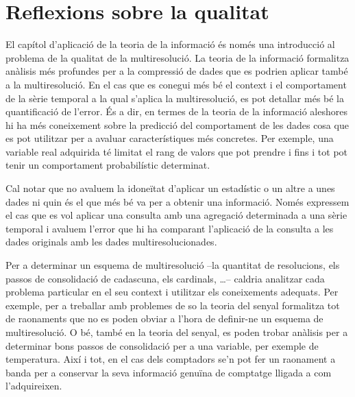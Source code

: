 \section{Reflexions sobre la qualitat}


El capítol d'aplicació de la teoria de la informació és només una
introducció al problema de la qualitat de la multiresolució.  La
teoria de la informació formalitza anàlisis més profundes per a la
compressió de dades que es podrien aplicar també a la multiresolució.
En el cas que es conegui més bé el context i el comportament de la
sèrie temporal a la qual s'aplica la multiresolució, es pot detallar
més bé la quantificació de l'error. És a dir, en termes de la teoria
de la informació aleshores hi ha més coneixement sobre la predicció
del comportament de les dades cosa que es pot utilitzar per a avaluar
característiques més concretes. Per exemple, una variable real
adquirida té limitat el rang de valors que pot prendre i fins i tot
pot tenir un comportament probabilístic determinat.



Cal notar que no avaluem la idoneïtat d'aplicar un estadístic o un
altre a unes dades ni quin és el que més bé va per a obtenir una
informació. Només expressem el cas que es vol aplicar una consulta amb
una agregació determinada a una sèrie temporal i avaluem l'error que
hi ha comparant l'aplicació de la consulta a les dades originals amb
les dades multiresolucionades. 

Per a determinar un esquema de multiresolució --la quantitat de
resolucions, els passos de consolidació de cadascuna, els cardinals,
\dots-- caldria analitzar cada problema particular en el seu context i
utilitzar els coneixements adequats. Per exemple, per a treballar amb
problemes de so la teoria del senyal formalitza tot de raonaments que
no es poden obviar a l'hora de definir-ne un esquema de
multiresolució.  O bé, també en la teoria del senyal, es poden trobar
anàlisis per a determinar bons passos de consolidació per a una
variable, per exemple de temperatura. Així i tot, en el cas dels
comptadors se'n pot fer un raonament a banda per a conservar la seva
informació genuïna de comptatge lligada a com l'adquireixen.


